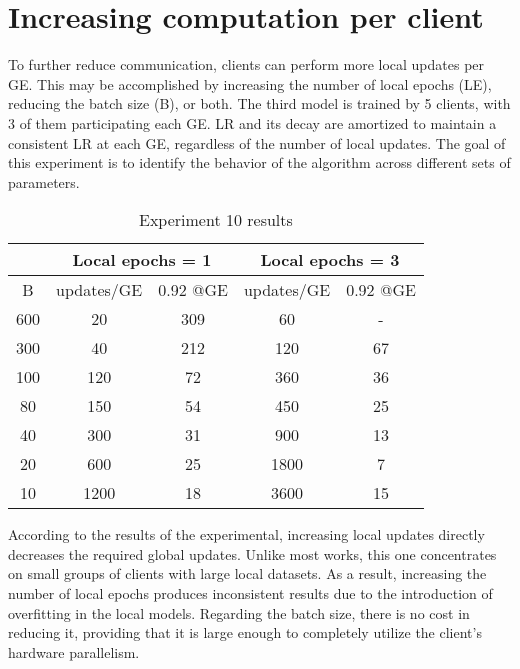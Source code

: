 \section{Increasing computation per client}
To further reduce communication, clients can perform more local updates per GE. This may be accomplished by increasing the number of local epochs (LE), reducing the batch size (B), or both. The third model is trained by 5 clients, with 3 of them participating each GE. LR and its decay are amortized to maintain a consistent LR at each GE, regardless of the number of local updates. The goal of this experiment is to identify the behavior of the algorithm across different sets of parameters.

\begin{table}[H]
    \center
    \begin{tabular}{ | c | c c | c c | }
        \hline
        & \multicolumn{2}{|c|}{Local epochs = 1} & \multicolumn{2}{|c|}{Local epochs = 3} \\\hline
        B & updates/GE &  0.92 @GE & updates/GE &  0.92 @GE\\\hline
        600 & 20 & 309 & 60 & -\\
        300 & 40 & 212 & 120 & 67\\
        100 & 120 & 72 & 360 & 36\\
        80 & 150 & 54 & 450 & 25\\
        40 & 300 & 31 & 900 & 13\\
        20 & 600 & 25 & 1800 & 7\\
        10 & 1200 & 18 & 3600 & 15\\\hline
    \end{tabular}
    \caption[Experiment 10 results]{Experiment 10 results}
\end{table}

According to the results of the experimental, increasing local updates directly decreases the required global updates. Unlike most works, this one concentrates on small groups of clients with large local datasets. As a result, increasing the number of local epochs produces inconsistent results due to the introduction of overfitting in the local models. Regarding the batch size, there is no cost in reducing it, providing that it is large enough to completely utilize the client's hardware parallelism.
